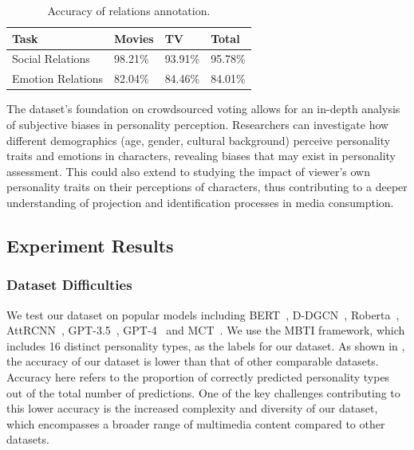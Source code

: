 \begin{table}[ht]
    \centering
    \small
    \begin{tabular}{llll}
        \hline
        \textbf{Task} & \textbf{Movies} & \textbf{TV} & \textbf{Total}\\
        \hline
        Social Relations& 98.21\% & 93.91\% & 95.78\%\\
        \hline
        Emotion Relations& 82.04\% & 84.46\% & 84.01\%\\
        \hline
    \end{tabular}
    \caption{Accuracy of relations annotation.} 
\label{table:annota_eval}
\end{table}

The dataset's foundation on crowdsourced voting allows for an in-depth analysis of subjective biases in personality perception. Researchers can investigate how different demographics (age, gender, cultural background) perceive personality traits and emotions in characters, revealing biases that may exist in personality assessment. This could also extend to studying the impact of viewer's own personality traits on their perceptions of characters, thus contributing to a deeper understanding of projection and identification processes in media consumption.

\subsection{Experiment Results}
\subsubsection{Dataset Difficulties}
We test our dataset on popular models including BERT~\cite{devlin2019bert}, D-DGCN~\cite{yang2023orders}, Roberta~\cite{liu2019roberta}, AttRCNN~\cite{article1}, GPT-3.5~\cite{openai2023gpt35}, GPT-4~\cite{GPT-4-0125} and MCT~\cite{10386376}. We use the MBTI framework, which includes 16 distinct personality types, as the labels for our dataset. As shown in , the accuracy of our dataset is lower than that of other comparable datasets. Accuracy here refers to the proportion of correctly predicted personality types out of the total number of predictions. One of the key challenges contributing to this lower accuracy is the increased complexity and diversity of our dataset, which encompasses a broader range of multimedia content compared to other datasets. 



